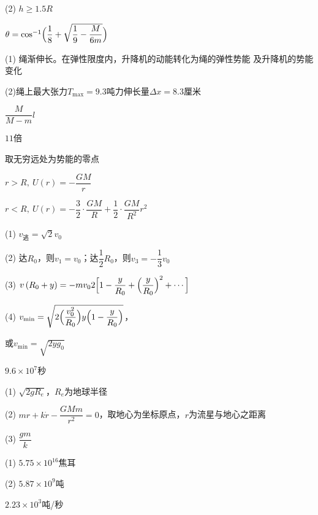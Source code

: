 (2) $ h \geqslant 1 . 5 R   $

\clearpage
\answer $ \theta = \cos ^ { - 1 } \Bigl( \dfrac { 1 } { 8 } + \sqrt { \dfrac { 1 } { 9 } - \dfrac { M } { 6 m } } \Bigr)   $

\answer (1) 绳渐伸长。在弹性限度内，升降机的动能转化为绳的弹性势能
及升降机的势能变化

(2)绳上最大张力$ T_\text{max}=9.3 $吨力伸长量$  \Delta x = 8 . 3   $厘米

\answer $ \dfrac { M } { M - m } l   $

\answer $ 11 $倍

\answer 取无穷远处为势能的零点

$ r > R,~ U \left( r \right) = - \dfrac { G M } { r }$

$ r < R,~ U \left( r \right) = - \dfrac { 3 } { 2 } \cdot \dfrac { G M } { R } + \dfrac { 1 } { 2 } \cdot \dfrac { G M } { R ^ { 2 } } r ^ { 2 } $

\answer (1) $ v _ \text{逃} = \sqrt { 2 } v _ { 0 }  $

(2) 达$ R_0 $，则$  v _ { 1 } = v _ { 0 }  $；达$ \dfrac { 1 } { 2 } R _ { 0 } $，则$ v _ { 3 } = - \dfrac { 1 } { 3 } v _ { 0 }  $

(3) $v\left(R_{0}+y\right)=-m v_{0} 2\Bigl[1-\dfrac{y}{R_{0}}+\Bigl(\dfrac{y}{R_{0}}\Bigr)^{2}+\cdots\Bigr]$

(4) $v_{\text{min}}=\sqrt{2\Bigl(\dfrac{v_{0}^{2}}{R_{0}}\Bigr) y\Bigl(1-\dfrac{y}{R_{0}}\Bigr)}$，

或$v_{\text{min}} = \sqrt { 2 y g _ { 0 } } $

\answer $ 9 . 6 \times 1 0 ^ { 7 } $秒

\answer (1) $ \sqrt { 2 g R _ { e } }  $，$ R_e $为地球半径

(2) $ m r + k \dot{r} - \dfrac { G M m } { r ^ { 2 } } = 0  $，取地心为坐标原点，$ r $为流星与地心之距离

(3) $ \dfrac{g m}{k} $

\answer (1) $ 5 . 7 5 \times 1 0 ^ { 16 }   $焦耳

(2) $ 5.87\times 10 ^9 $吨

\answer $ 2 . 2 3 \times 1 0 ^ { 3 }  $吨/秒

